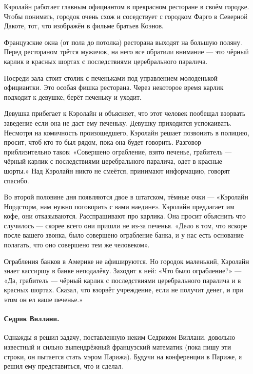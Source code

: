 \documentclass{book}
\begin{document}
Кэролайн работает главным официантом в прекрасном ресторане в своём городке.
Чтобы понимать, городок очень схож и соседствует с городком Фарго в Северной Дакоте, тот, что изображён в фильме братьев Коэнов.

Французские окна (от пола до потолка) ресторана выходят на большую поляну.
Перед рестораном трётся мужичок, на него все обратили внимание --- это чёрный карлик в красных шортах с последствиями церебрального паралича.

Посреди зала стоит столик с печеньками под управлением молоденькой официантки.
Это особая фишка ресторана.
Через некоторое время карлик подходит к девушке, берёт печеньку и уходит.

Девушка прибегает к Кэролайн и объясняет, что этот человек пообещал взорвать заведение если она не даст ему печеньку.
Девушку приходится успокаивать.
Несмотря на комичность произошедшего, Кэролайн решает позвонить в полицию, просит, чтоб кто-то был рядом, пока она будет говорить.
Разговор приблизительно таков:
«Совершено ограбление, взято печенье, грабитель --- чёрный карлик с последствиями церебрального паралича, одет в красные шорты.»
Над Кэролайн никто не смеётся, принимают информацию, говорят спасибо.

Во второй половине дня появляются двое в штатском, тёмные очки --- «Кэролайн Нордсторм, нам нужно поговорить с вами наедине».
Кэролайн предлагает им кофе, они отказываются.
Расспрашивают про карлика.
Она просит объяснить что случилось --- скорее всего они пришли не из-за печенья.
«Дело в том, что вскоре после вашего звонка, было совершено ограбление банка, и у нас есть основание полагать, что оно совершено тем же человеком».

Ограбления банков в Америке не афишируются.
Но городок маленький, Кэролайн знает кассиршу в банке неподалёку.
Заходит к ней: «Что было ограбление?» --- «Да, грабитель --- чёрный карлик с последствиями церебрального паралича и в красных шортах. Сказал, что взорвёт учреждение, если не получит денег, и
при этом он ел ваше печенье.»

\paragraph{Седрик Виллани.}
Однажды я решил задачу, поставленную неким Седриком Виллани, довольно известный и сильно выпендрёжный французский математик (пока пишу эти строки, он пытается стать мэром Парижа).
Будучи на конференции в Париже, я решил ему представиться, что и сделал.
\end{document}
